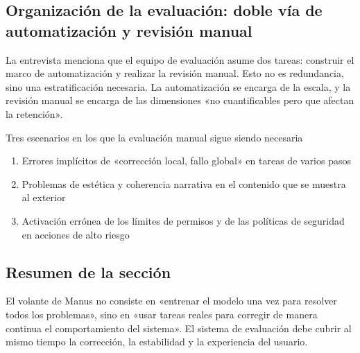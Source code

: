 \subsection{Organización de la evaluación: doble vía de automatización y revisión manual}

La entrevista menciona que el equipo de evaluación asume dos tareas: construir el marco de automatización y realizar la revisión manual. Esto no es redundancia, sino una estratificación necesaria. La automatización se encarga de la escala, y la revisión manual se encarga de las dimensiones «no cuantificables pero que afectan la retención».

\begin{knowledgebox}{Tres escenarios en los que la evaluación manual sigue siendo necesaria}
\begin{enumerate}
    \item Errores implícitos de «corrección local, fallo global» en tareas de varios pasos
    \item Problemas de estética y coherencia narrativa en el contenido que se muestra al exterior
    \item Activación errónea de los límites de permisos y de las políticas de seguridad en acciones de alto riesgo
\end{enumerate}
\end{knowledgebox}

\subsection{Resumen de la sección}

El volante de Manus no consiste en «entrenar el modelo una vez para resolver todos los problemas», sino en «usar tareas reales para corregir de manera continua el comportamiento del sistema». El sistema de evaluación debe cubrir al mismo tiempo la corrección, la estabilidad y la experiencia del usuario.


